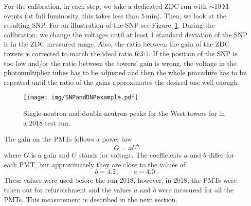 % 



For the calibration, in each step, we take a dedicated ZDC run with
$\sim$10$\,$M events (at full luminosity, this takes less than $5\,$min). Then, we
look at the resulting SNP\@.
For an illustration of the SNP see Figure~\ref{SNPillustration}\@.
During the calibration, we change the voltages until at least 1 standard deviation of the SNP is in the ZDC measured
range. Also, the ratio between the gain of the ZDC towers is corrected to match the ideal ratio 6:3:1\@. If the position of the SNP is too low and/or the ratio between the towers' gain is wrong,
the voltage in the photomultiplier tubes has to be adjusted and then the whole procedure
has to be repeated until the ratio of the gains approximates the desired one well enough.


\begin{figure}[!htb]
\begin{center}
\texttt{[image: img/SNPandDNPexample.pdf]}
\end{center}
\caption[ Single-neutron and double-neutron peaks for the West towers for in a 2018 test run.]{\label{SNPillustration} Single-neutron and double-neutron peaks for the West towers for in a 2018 test run.}

\end{figure}

The gain on the PMTs follows a power law
\begin{equation} \label{powerLaw}
G = aU^b
\end{equation}
where $G$ is a gain and $U$ stands for voltage. The coefficients $a$ and $b$ differ for each PMT, but approximately they are close to the values of~\cite{ZDCvoltsDependence}
\begin{equation}
b=4.2\,, \qquad a=4.0\,.
\end{equation}
These values were used before the run 2018, however, in 2018, the PMTs were taken out for refurbishment and the values $a$ and $b$ were measured for all the PMTs. This measurement is described in the next section.

